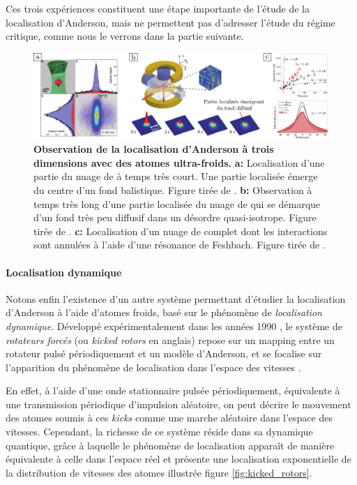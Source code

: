 Ces trois expériences constituent une étape importante de l'étude de la localisation d'Anderson, mais ne permettent pas d'adresser l'étude du régime critique, comme nous le verrons dans la partie suivante. 

\begin{figure}
\centering
\includegraphics[width=\textwidth]{Fig/Localisation/localisation_3D_atomes_v1.pdf}
\caption{\textbf{Observation de la localisation d'Anderson à trois dimensions avec des atomes ultra-froids.} \textbf{a:} Localisation d'une partie du nuage de  à temps très court. Une partie localisée émerge du centre d'un fond balistique. Figure tirée de \citep{kondov2011three}. \textbf{b:} Observation à temps très long d'une partie localisée du nuage de  qui se démarque d'un fond très peu diffusif dans un désordre quasi-isotrope. Figure tirée de \citep{jendrzejewski2012three}. \textbf{c:} Localisation d'un nuage de  complet dont les interactions sont annulées à l'aide d'une résonance de Feshbach. Figure tirée de \citep{semeghini2015measurement}.}
\label{fig:localisation_3D_atomes_froids}
\end{figure}





\paragraph*{Localisation dynamique}
Notons enfin l'existence d'un autre système permettant d'étudier la localisation d'Anderson à l'aide d'atomes froids, basé sur le phénomène de \emph{localisation dynamique}. Développé expérimentalement dans les années 1990 \citep{moore1995atom}, le système de \emph{rotateurs forcés} (ou \emph{kicked rotors} en anglais) repose sur un mapping entre un rotateur pulsé périodiquement et un modèle d'Anderson, et se focalise sur l'apparition du phénomène de localisation dans l'espace des vitesses \citep{lemarietel-00424399}. 

En effet, à l'aide d'une onde stationnaire pulsée périodiquement, équivalente à une transmission périodique d'impulsion aléatoire, on peut décrire le mouvement des atomes soumis à ces \emph{kicks} comme une marche aléatoire dans l'espace des vitesses. Cependant, la richesse de ce système réside dans sa dynamique quantique, grâce à laquelle le phénomène de localisation apparaît de manière équivalente à celle dans l'espace réel et présente une localisation exponentielle de la distribution de vitesses des atomes illustrée figure \ref{fig:kicked_rotors}.

